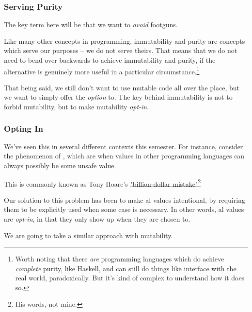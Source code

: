 \documentclass[aspectratio=169]{beamer}
\begin{document}
\begin{frame}[fragile]
  \frametitle{Serving Purity}

  The key term here will be that we want to \textit{avoid} footguns.

  \pause
  \vspace{\fill}

  Like many other concepts in programming, immutability and purity are concepts
  which serve our purposes -- we do not serve theirs. That means that we do
  not need to bend over backwards to achieve immutability and purity, if the
  alternative is genuinely more useful in a particular circumstance.\footnote{Worth
  noting that there \textit{are} programming languages which do achieve \textit{complete}
  purity, like Haskell, and can still do things like interface with the real world,
  paradoxically. But it's kind of complex to understand how it does so.}

  \pause
  \vspace{\fill}

  That being said, we still don't want to use mutable code all over the place, but
  we want to simply offer the \textit{option} to. The key behind immutability is
  not to forbid mutability, but to make mutability \textit{opt-in}.
\end{frame}

\begin{frame}[fragile]
  \frametitle{Opting In}

  We've seen this in several different contexts this semester. For instance, consider
  the phenomenon of , which are when values in other programming
  languages can always possibly be some unsafe  value.

  \pause
  \vspace{\fill}

  This is commonly known as Tony Hoare's
  {\color{blue}\href{https://www.infoq.com/presentations/Null-References-The-Billion-Dollar-Mistake-Tony-Hoare/}{"billion-dollar mistake"}}\footnote{His words, not mine.}

  \pause
  \vspace{\fill}

  Our solution to this problem has been to make al values intentional,
  by requiring them to be explicitly used when some  case is necessary.
  In other words, al values are \textit{opt-in}, in that they only
  show up when they are chosen to.

  \pause
  \vspace{\fill}

  We are going to take a similar approach with mutability.
\end{frame}
\end{document}
